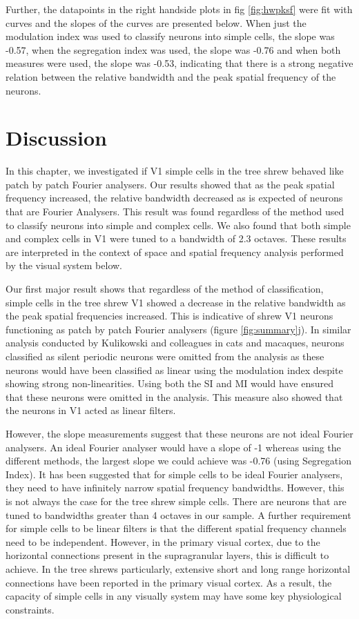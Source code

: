 	Further, the datapoints in the right handside plots in fig \ref{fig:hwpksf} were fit with curves and the slopes of the curves are presented below. When just the modulation index was used to classify neurons into simple cells, the slope was -0.57, when the segregation index was used, the slope was -0.76 and when both measures were used, the slope was -0.53, indicating that there is a strong negative relation between the relative bandwidth and the peak spatial frequency of the neurons.
	
	\section{Discussion}
	
	In this chapter, we investigated if V1 simple cells in the tree shrew behaved like patch by patch Fourier analysers. Our results showed that as the peak spatial frequency increased, the relative bandwidth decreased as is expected of neurons that are Fourier Analysers. This result was found regardless of the method used to classify neurons into simple and complex cells. We also found that both simple and complex cells in V1 were tuned to a bandwidth of 2.3 octaves. These results are interpreted in the context of space and spatial frequency analysis performed by the visual system below.
	
	Our first major result shows that regardless of the method of classification, simple cells in the tree shrew V1 showed a decrease in the relative bandwidth as the peak spatial frequencies increased. This is indicative of shrew V1 neurons functioning as patch by patch Fourier analysers (figure \ref{fig:summary}j). In similar analysis conducted by Kulikowski and colleagues in cats and macaques, neurons classified as silent periodic neurons were omitted from the analysis as these neurons would have been classified as linear using the modulation index despite showing strong non-linearities. Using both the SI and MI would have ensured that these neurons were omitted in the analysis. This measure also showed that the neurons in V1 acted as linear filters.
	
	However, the slope measurements suggest that these neurons are not ideal Fourier analysers. An ideal Fourier analyser would have a slope of -1 whereas using the different methods, the largest slope we could achieve was -0.76 (using Segregation Index). It has been suggested that for simple cells to be ideal Fourier analysers, they need to have infinitely narrow spatial frequency bandwidths. However, this is not always the case for the tree shrew simple cells. There are neurons that are tuned to bandwidths greater than 4 octaves in our sample. A further requirement for simple cells to be linear filters is that the different spatial frequency channels need to be independent. However, in the primary visual cortex, due to the horizontal connections present in the supragranular layers, this is difficult to achieve. In the tree shrews particularly, extensive short and long range horizontal connections have been reported in the primary visual cortex. As a result, the capacity of simple cells in any visually system may have some key physiological constraints.
	
